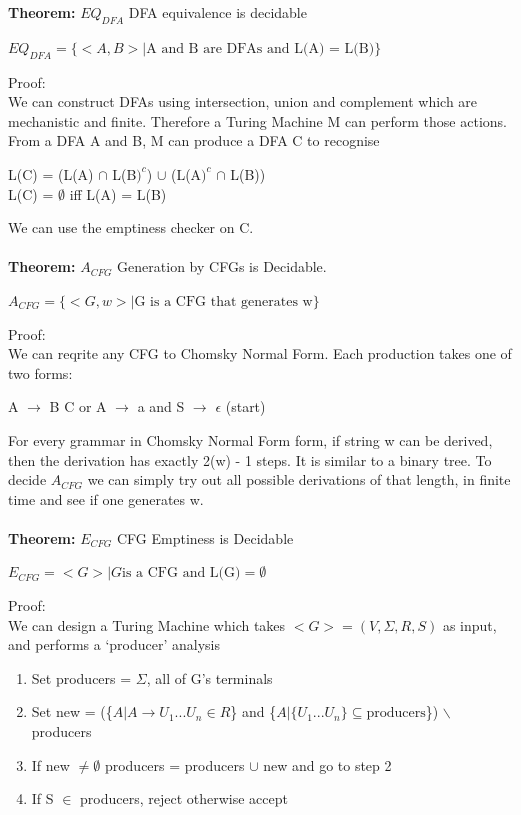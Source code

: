 \documentclass[a4paper,10pt]{article}
\begin{document}
\textcolor{Peach}{\textbf{Theorem: }} $EQ_{DFA}$ DFA equivalence is decidable\\
\begin{center}
$EQ_{DFA}= \{<A,B> | \textrm{A and B are DFAs and L(A) = L(B)}\}$
\end{center}
Proof: \\ 
We can construct DFAs using intersection, union and complement which are mechanistic and finite. Therefore a Turing Machine M can perform those actions. From a DFA A and B, M can produce a DFA C to recognise \\
\begin{center}
L(C) = (L(A) $\cap$ L(B$)^{c}$) $\cup$ (L(A$)^{c}$ $\cap$ L(B)) \\ 
L(C) = $\emptyset$ iff L(A) = L(B)
\end{center}
We can use the emptiness checker on C. \\\\
\textcolor{Peach}{\textbf{Theorem:}} $A_{CFG}$ Generation by CFGs is Decidable. \\
\begin{center}
$A_{CFG} = \{<G, w> | \textrm{G is a CFG that generates w}\}$
\end{center}
Proof: \\ 
We can reqrite any CFG to Chomsky Normal Form. Each production takes one of two forms: 
\begin{center}
A $\rightarrow$ B C    or   A $\rightarrow$ a  and S $\rightarrow$  $\epsilon$ (start) 
\end{center}
For every grammar in Chomsky Normal Form form, if string w can be derived, then the derivation has exactly 2(w) - 1 steps. It is similar to a binary tree. To decide $A_{CFG}$ we can simply try out all possible derivations of that length, in finite time and see if one generates w. \\\\
\newpage
\noindent \textcolor{Peach}{\textbf{Theorem:}} $E_{CFG}$ CFG Emptiness is Decidable \\
\begin{center}
$E_{CFG} = {<G> | G \textrm{is a CFG and L(G)} = \emptyset}$
\end{center}
Proof: \\ 
We can design a Turing Machine which takes $<G> = (V, \Sigma, R, S)$ as input, and performs a `producer' analysis 
\begin{enumerate}
\item Set producers = $\Sigma$, all of G's terminals
\item Set new = (\{$A | A \rightarrow U_{1} ... U_{n} \in R$\} and \{$A | \{U_{1}...U_{n}\} \subseteq \textrm{producers}$\}) $\backslash$ producers 
\item If new $\neq \emptyset$ producers = producers $\cup$ new and go to step 2 
\item If S $\in$ producers, reject otherwise accept
\end{enumerate}
\end{document}
